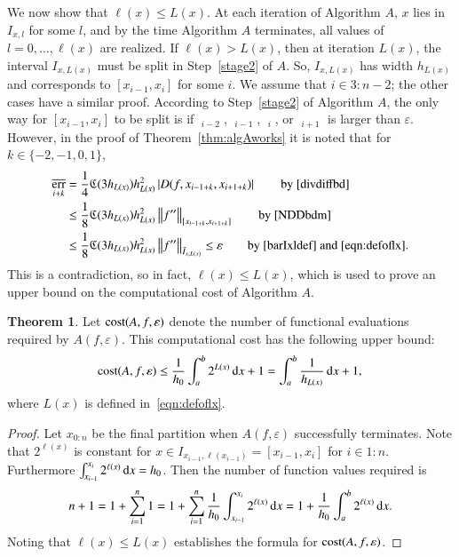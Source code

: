 \documentclass[review]{elsarticle}
\newcommand{\abstol}{\varepsilon}
\newcommand{\oton}{1\!:\!n}
\theoremstyle{definition}
\newcommand{\Ixl}{I_{x,l}}
\DeclareMathOperator{\oerr}{\overline{err}}
\newtheorem{theorem}{Theorem}
\begin{document}
We now show that $\ell(x) \le L(x)$. At each iteration of Algorithm $A$, $x$
lies in $\Ixl$ for some $l$, and by the time Algorithm $A$ terminates, all
values of $l = 0, \ldots, \ell(x)$ are realized. If $\ell(x) > L(x)$, then at
 iteration $L(x)$, the interval  $I_{x,L(x)}$ must be split in Step~\ref{stage2} of $A$. So,
$I_{x,L(x)}$ has width $h_{L(x)}$ and corresponds to $[x_{i-1},x_i]$ for some
$i$. We assume that $i \in 3\!:\!n-2$; the other cases have a similar proof.
According to Step~\ref{stage2} of Algorithm $A$, the only way for
$[x_{i-1},x_i]$ to be split is if $\oerr_{i-2}$, $\oerr_{i-1}$, $\oerr_{i}$, or
$\oerr_{i+1}$ is larger than $\abstol$. However, in the proof of
Theorem~\ref{thm:algAworks} it is noted that for $k \in \{-2, -1, 0, 1\}$,
\begin{align}
\nonumber
\oerr_{i+k} & = \frac{1}4 \fC(3h_{L(x)}) h_{L(x)}^2 \abs{D(f,x_{i-1+k},x_{i+1+k})} \qquad
\text{by \eqref{divdiffbd}} \\
\nonumber
& \le \frac{1} 8  \fC(3h_{L(x)}) h_{L(x)}^2\norm[{[x_{i-1+k},x_{i+1+k}]}]{f''}  \qquad
\text{by \eqref{NDDbdm}}\\
& \le \frac{1} 8  \fC(3h_{L(x)}) h_{L(x)}^2 \norm[\bar{I}_{x,L(x)}]{f''} \le \varepsilon \qquad
\text{by \eqref{barIxldef} and \eqref{eqn:defoflx}}. \label{oerrbd}
\end{align}
This is a contradiction, so in fact, $\ell(x) \le L(x)$, which is used to prove an upper
bound on the
computational cost of Algorithm $A$.

\begin{theorem}\label{thm:cost}
Let $\cost(A,f,\abstol)$ denote the number of functional evaluations required by
$A(f,\abstol)$. This computational cost has the following upper bound:
\begin{equation*}
\cost(A,f,\abstol) \le \frac{1}{h_0}\int_a^b 2^{L(x)} \, \dif x +1
= \int_a^b \frac{1}{h_{L(x)}} \, \dif x +1, \\
\end{equation*}
where $L(x)$ is defined in~\eqref{eqn:defoflx}.
\end{theorem}

\begin{proof}
Let $x_{0:n}$ be the final partition when $A(f,\abstol)$
successfully terminates. Note that $2^{\ell(x)}$ is constant for $x \in
I_{x_{i-1},\ell(x_{i-1})} = [x_{i-1},x_{i}]$ for $i \in \oton$. Furthermore
$\int_{x_{i-1}}^{x_{i}} 2^{\ell(x)} \, {\rm d} x = h_0$. Then the number of
function values required is
\begin{equation*}
n+1 = 1 + \sum_{i=1}^{n} 1 = 1 + \sum_{i=1}^{n} \frac{1}{h_0}
\int_{x_{i-1}}^{x_{i}} 2^{\ell(x)} \, {\rm d}  x = 1 + \frac{1}{h_0}\int_a^b 2^{\ell(x)} \, {\rm d} x.
\end{equation*}
Noting that $\ell(x) \le L(x)$ establishes the formula for $\cost(A,f,\abstol)$.
\end{proof}
\end{document}
